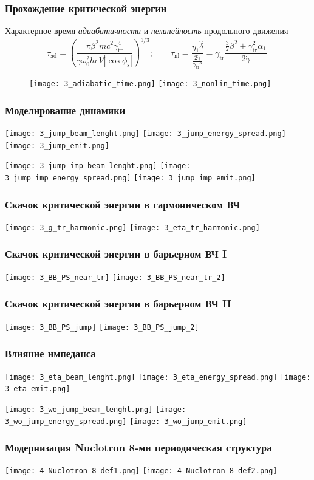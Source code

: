 \begin{frame}
	\frametitle{Прохождение критической энергии}
	Характерное время \textit{адиабатичности} и \textit{нелинейность} продольного движения
	\begin{equation}
		\tau_{\textrm{ad}}=\left(\frac{\pi\beta^2mc^2\gamma_{\textrm{tr}}^4}{\dot{\gamma}\omega_0^2heV\left|\cos{\phi_{\textrm{s}}}\right|}\right)^{1/3}; \quad\quad
		\tau_{\textrm{nl}}=\frac{\eta_1\hat{\delta}}{\frac{2\dot{\gamma}}{{\gamma_{\textrm{tr}}}^3}}=\gamma_{\textrm{tr}}\frac{\frac{3}{2}\beta^2+\gamma_{\textrm{tr}}^2\alpha_1}{2\dot{\gamma}}\
	\end{equation}
	
	\begin{figure}
		\texttt{[image: 3\_adiabatic\_time.png]}
		\texttt{[image: 3\_nonlin\_time.png]}
	\end{figure}
\end{frame}
\begin{frame}
	\frametitle{Моделирование динамики}
	\centering
	\texttt{[image: 3\_jump\_beam\_lenght.png]}
	\texttt{[image: 3\_jump\_energy\_spread.png]}
	\texttt{[image: 3\_jump\_emit.png]}
	
	\texttt{[image: 3\_jump\_imp\_beam\_lenght.png]}
	\texttt{[image: 3\_jump\_imp\_energy\_spread.png]}
	\texttt{[image: 3\_jump\_imp\_emit.png]}
\end{frame}
\begin{frame}
	\frametitle{Скачок критической энергии в гармоническом ВЧ}
	\centering
	\texttt{[image: 3\_g\_tr\_harmonic.png]}
	\texttt{[image: 3\_eta\_tr\_harmonic.png]}
\end{frame}
\begin{frame}
	\frametitle{Скачок критической энергии в барьерном ВЧ I}
	\centering
	\texttt{[image: 3\_BB\_PS\_near\_tr]}
	\texttt{[image: 3\_BB\_PS\_near\_tr\_2]}
\end{frame}
\begin{frame}
	\frametitle{Скачок критической энергии в барьерном ВЧ II}
	\centering
	\texttt{[image: 3\_BB\_PS\_jump]}
	\texttt{[image: 3\_BB\_PS\_jump\_2]}
\end{frame}
\begin{frame}
	\frametitle{Влияние импеданса}
	\centering
	\texttt{[image: 3\_eta\_beam\_lenght.png]}
	\texttt{[image: 3\_eta\_energy\_spread.png]}
	\texttt{[image: 3\_eta\_emit.png]}
	
	\texttt{[image: 3\_wo\_jump\_beam\_lenght.png]}
	\texttt{[image: 3\_wo\_jump\_energy\_spread.png]}
	\texttt{[image: 3\_wo\_jump\_emit.png]}
\end{frame}
\begin{frame}
	\frametitle{Модернизация Nuclotron 8-ми периодическая структура}
	\centering
	\texttt{[image: 4\_Nuclotron\_8\_def1.png]}
	\texttt{[image: 4\_Nuclotron\_8\_def2.png]}
\end{frame}
